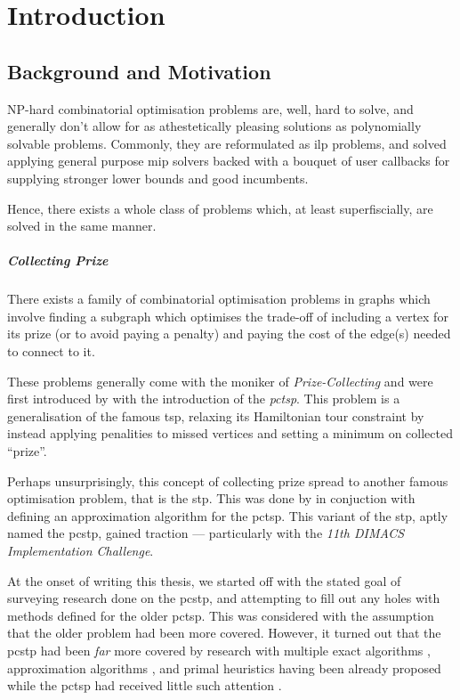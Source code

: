 \chapter{Introduction}
\section{Background and Motivation}\label{sec:intro:background}
NP-hard combinatorial optimisation problems are, well, hard to solve, and generally
don't allow for as athestetically pleasing solutions as polynomially solvable problems.
Commonly, they are reformulated as \gls{ilp} problems, and solved applying general purpose
\gls{mip} solvers backed with a bouquet of user callbacks for supplying
stronger lower bounds and good incumbents.

Hence, there exists a whole class of problems which, at least superfiscially, are
solved in the same manner.

\paragraph{Collecting Prize}
There exists a family of combinatorial optimisation problems in graphs which involve
finding a subgraph which optimises the trade-off of including a vertex for its prize
(or to avoid paying a penalty) and paying the cost of the edge(s) needed to connect
to it.

These problems generally come with the moniker of \textit{Prize-Collecting}
and were first introduced by \citet*{balas1989prize}
with the introduction of the \textit{\gls{pctsp}}. This problem is a generalisation of
the famous \gls{tsp}, relaxing its Hamiltonian tour constraint by instead applying penalities
to missed vertices and setting a minimum on collected ``prize''.

Perhaps unsurprisingly, this concept of collecting prize spread to another famous optimisation
problem, that is the \gls{stp}. This was done by \citet{Bienstock1993} in conjuction with
defining an approximation algorithm for the \gls{pctsp}. This variant of the \gls{stp},
aptly named the \gls{pcstp}, gained traction --- particularly with the
\textit{11th DIMACS Implementation Challenge}\citep{DIMACS}.

At the onset of writing this thesis, we started off with the stated
goal of surveying research done
on the \gls{pcstp}, and attempting to fill out any holes with methods defined for the older
\gls{pctsp}. This was considered with the assumption that the older problem had
been more covered.
However, it turned out that the \gls{pcstp} had been \textit{far} more covered
by research with multiple exact algorithms
\citep{ljubic2005solving, leitner2016dual, gamrath2017scip},
approximation algorithms \citep{Bienstock1993,goemans1995general,Johnson:2000:PCS:338219.338637},
and primal heuristics \citep{canuto2001local,fu2014knowledge,akhmedov2016divide}
having been already proposed while the \gls{pctsp} had received little such attention
\citep{archetti2014chapter}.


